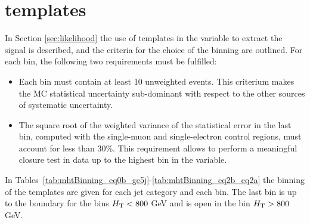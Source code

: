 \section{\mht templates}
\label{sec:mht_templates}

In Section \ref{sec:likelihood} the use of templates in the \mht variable to extract the signal is described, and the criteria for the choice of the binning are outlined. For each bin, the following two requirements must be fulfilled:
\begin{itemize}
  \item Each bin must contain at least 10 unweighted events. This criterium makes the MC statistical uncertainty sub-dominant with respect to the other sources of systematic uncertainty.
    \item The square root of the weighted variance of the statistical error in the last \mht bin, computed with the single-muon and single-electron control regions, must account for less than 30\%. This requirement allows to perform a meaningful closure test in data up to the highest bin in the \mht variable.
\end{itemize}

In Tables~\ref{tab:mhtBinning_eq0b_ge5j}-\ref{tab:mhtBinning_eq2b_eq2a} the binning of the \mht templates are given for each jet category and each \scalht bin. The last bin is up to the \scalht boundary for the bins $\scalht<800$ GeV and is open in the bin $\scalht>800$ GeV.

\newpage

